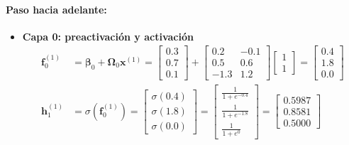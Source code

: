 \documentclass[10pt,a4paper]{article}
\begin{document}
\paragraph{Paso hacia adelante:}
\begin{itemize}\itemsep-3pt   
    \item \textbf{Capa 0: preactivación y activación}
    \begin{align*}
    \mathbf{f}_0^{(1)} &= \boldsymbol{\beta}_0 + \boldsymbol{\Omega}_0 \mathbf{x}^{(1)} = \begin{bmatrix} 0.3 \\ 0.7 \\ 0.1 \end{bmatrix} + \begin{bmatrix} 0.2 & -0.1 \\ 0.5 & 0.6 \\ -1.3 & 1.2 \end{bmatrix} \begin{bmatrix} 1 \\ 1 \end{bmatrix} = \begin{bmatrix} 0.4 \\ 1.8 \\ 0.0 \end{bmatrix} \\[0.1cm]
    \mathbf{h}_1^{(1)} &= \sigma(\mathbf{f}_0^{(1)}) = \begin{bmatrix} \sigma(0.4) \\ \sigma(1.8) \\ \sigma(0.0) \end{bmatrix} = \begin{bmatrix} \frac{1}{1+e^{-0.4}} \\ \frac{1}{1+e^{-1.8}} \\ \frac{1}{1+e^0} \end{bmatrix} = \begin{bmatrix} 0.5987 \\ 0.8581 \\ 0.5000 \end{bmatrix}
    \end{align*}


\end{itemize}
\end{document}
